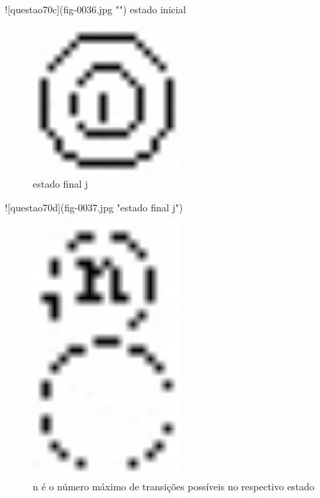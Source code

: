 \documentclass{exam}
\begin{document}
\begin{questions}
\begin{figure}[H]
\begin{center}
		\caption{}
	\end{center}
\end{figure}
![questao70c](fig-0036.jpg "")
estado inicial
\begin{figure}[H]
	\begin{center}
		\includegraphics[width=0.5\textwidth]{CIENCIA_DA_COMPUTACAO_Prova2005-utf8_figuras/fig-0037.jpg}
		\caption{estado final j}
	\end{center}
\end{figure}
![questao70d](fig-0037.jpg "estado final j") 
\begin{figure}[H]
	\begin{center}
		\includegraphics[width=0.5\textwidth]{CIENCIA_DA_COMPUTACAO_Prova2005-utf8_figuras/fig-0038.jpg}
		\caption{n é o número máximo de transições possíveis no respectivo estado}
	\end{center}
\end{figure}

\end{questions}
\end{document}
